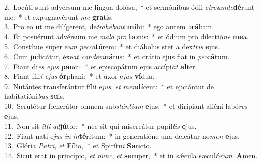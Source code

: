 {2.~}Locúti sunt advérsum me lingua dolósa,~† et sermónibus ódii \textit{cir}\textit{cum}\textit{de}\textbf{dé}runt me:~* et expugnavérunt \textit{me} \textbf{gra}tis.\\
{3.~}Pro eo ut me dilígerent, de\textit{tra}\textit{hé}\textit{bant} \textbf{mi}hi:~* ego autem \textit{o}\textbf{rá}bam.\\
{4.~}Et posuérunt advérsum me \textit{ma}\textit{la} \textit{pro} \textbf{bo}nis:~* et ódium pro dilectió\textit{ne} \textbf{me}a.\\
{5.~}Constítue super e\textit{um} \textit{pec}\textit{ca}\textbf{tó}rem:~* et diábolus stet a dex\textit{tris} \textbf{e}jus.\\
{6.~}Cum judicátur, éxe\textit{at} \textit{con}\textit{dem}\textbf{ná}tus:~* et orátio ejus fiat in \textit{pec}\textbf{cá}tum.\\
{7.~}Fiant di\textit{es} \textit{e}\textit{jus} \textbf{pau}ci:~* et episcopátum ejus accípi\textit{at} \textbf{al}ter.\\
{8.~}Fiant fíli\textit{i} \textit{e}\textit{jus} \textbf{ór}phani:~* et uxor e\textit{jus} \textbf{ví}dua.\\
{9.~}Nutántes transferántur fílii e\textit{jus}, \textit{et} \textit{men}\textbf{dí}cent:~* et ejiciántur de habitatióni\textit{bus} \textbf{su}is.\\
{10.~}Scrutétur fœnerátor omnem sub\textit{stán}\textit{ti}\textit{am} \textbf{e}jus:~* et dirípiant aliéni labó\textit{res} \textbf{e}jus.\\
{11.~}Non sit \textit{il}\textit{li} \textit{ad}\textbf{jú}tor:~* nec sit qui misereátur pupíl\textit{lis} \textbf{e}jus.\\
{12.~}Fiant nati e\textit{jus} \textit{in} \textit{in}\textbf{té}ritum:~* in generatióne una deleátur no\textit{men} \textbf{e}jus.\\
{13.~}Glória \textit{Pa}\textit{tri}, \textit{et} \textbf{Fí}lio,~* et Spirítu\textit{i} \textbf{San}cto.\\
{14.~}Sicut erat in princípio, \textit{et} \textit{nunc}, \textit{et} \textbf{sem}per,~* et in sǽcula sæculó\textit{rum}. \textbf{A}men.\\
